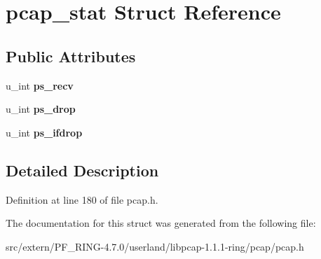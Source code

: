 \hypertarget{structpcap__stat}{
\section{pcap\_\-stat Struct Reference}
\label{structpcap__stat}
}
\subsection*{Public Attributes}
\begin{DoxyCompactItemize}
\item 
\hypertarget{structpcap__stat_a79d3f8a5ba8ec09473972f58e08ff3f0}{
u\_\-int {\bfseries ps\_\-recv}}
\label{structpcap__stat_a79d3f8a5ba8ec09473972f58e08ff3f0}

\item 
\hypertarget{structpcap__stat_a42d7c3f8d62d08562b5946124985bba9}{
u\_\-int {\bfseries ps\_\-drop}}
\label{structpcap__stat_a42d7c3f8d62d08562b5946124985bba9}

\item 
\hypertarget{structpcap__stat_affb900d4cd3deb2211dd1be0ac184f1e}{
u\_\-int {\bfseries ps\_\-ifdrop}}
\label{structpcap__stat_affb900d4cd3deb2211dd1be0ac184f1e}

\end{DoxyCompactItemize}


\subsection{Detailed Description}


Definition at line 180 of file pcap.h.



The documentation for this struct was generated from the following file:\begin{DoxyCompactItemize}
\item 
src/extern/PF\_\-RING-\/4.7.0/userland/libpcap-\/1.1.1-\/ring/pcap/pcap.h\end{DoxyCompactItemize}
